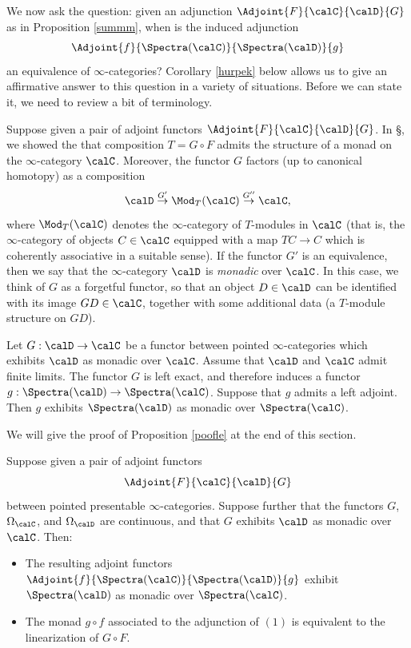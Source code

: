 We now ask the question: given an adjunction $\Adjoint{F}{\calC}{\calD}{G}$ as in
Proposition \ref{summm}, when is the induced adjunction
$$ \Adjoint{f}{\Spectra(\calC)}{\Spectra(\calD)}{g}$$ an equivalence of $\infty$-categories?
Corollary \ref{hurpek} below allows us to give an affirmative answer to this question in a variety of situations. Before we can state it, we need to review a bit of terminology.

Suppose given a pair of adjoint functors $\Adjoint{F}{\calC}{\calD}{G}$.
In \S {}, we showed the that composition $T=G \circ F$ admits the structure of
a monad on the $\infty$-category $\calC$. Moreover, the functor $G$ factors (up to canonical homotopy) as a composition
$$ \calD \stackrel{G'}{\rightarrow} \Mod_{T}(\calC) \stackrel{G''}{\rightarrow} \calC,$$
where $\Mod_{T}(\calC)$ denotes the $\infty$-category of $T$-modules in $\calC$ (that is,
the $\infty$-category of objects $C \in \calC$ equipped with a map $TC \rightarrow C$ which is coherently associative in a suitable sense). If the functor $G'$ is an equivalence, then we say that
the $\infty$-category $\calD$ is {\it monadic} over $\calC$. In this case, we think of 
$G$ as a forgetful functor, so that an object $D \in \calD$ can be identified with its image
$GD \in \calC$, together with some additional data (a $T$-module structure on $GD$).

\begin{proposition}\label{poofle}
Let $G: \calD \rightarrow \calC$ be a functor between pointed $\infty$-categories which
exhibits $\calD$ as monadic over $\calC$. Assume that $\calD$ and $\calC$ admit finite limits.
The functor $G$ is left exact, and therefore induces a functor 
$g: \Spectra(\calD) \rightarrow \Spectra(\calC)$. Suppose that $g$ admits a left adjoint. Then $g$ exhibits $\Spectra(\calD)$ as monadic over $\Spectra(\calC)$.
\end{proposition}

We will give the proof of Proposition \ref{poofle} at the end of this section. 

\begin{corollary}
Suppose given a pair of adjoint functors
$$\Adjoint{F}{\calC}{\calD}{G}$$
between pointed presentable $\infty$-categories. Suppose further that
the functors $G$, $\Omega_{\calC}$, and $\Omega_{\calD}$ are continuous, and
that $G$ exhibits $\calD$ as monadic over $\calC$.
Then:
\begin{itemize}
\item[$(1)$] The resulting adjoint functors
$\Adjoint{f}{\Spectra(\calC)}{\Spectra(\calD)}{g}$ exhibit $\Spectra(\calD)$ as monadic over
$\Spectra(\calC)$.

\item[$(2)$] The monad $g \circ f$ associated to the adjunction of $(1)$ is equivalent to the
linearization of $G \circ F$.
\end{itemize}
\end{corollary}

